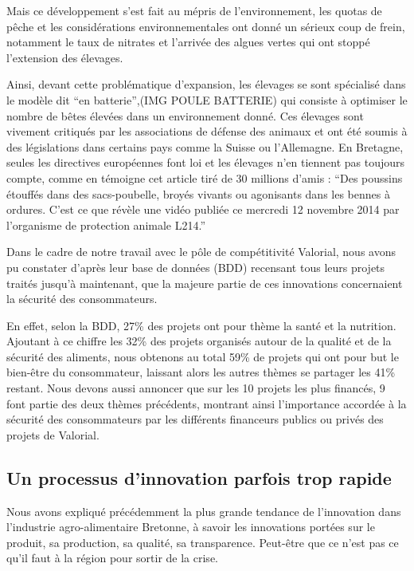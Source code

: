 \documentclass[a4paper,10pt]{report}
\begin{document}
			Mais ce développement s’est fait au mépris de l’environnement, les quotas de pêche et les considérations environnementales ont donné un sérieux coup de frein, notamment le taux de nitrates et l’arrivée des algues vertes qui ont stoppé l’extension des élevages.
			
			Ainsi, devant cette problématique d’expansion, les élevages se sont spécialisé dans le modèle dit “en batterie”,(IMG POULE BATTERIE) qui consiste à optimiser le nombre de bêtes élevées dans un environnement donné. Ces élevages sont vivement critiqués par les associations de défense des animaux  et ont été soumis à des législations dans certains pays comme la Suisse ou l’Allemagne. En Bretagne, seules les directives européennes font loi et les élevages n’en tiennent pas toujours compte, comme en témoigne cet article tiré de 30 millions d’amis : “Des poussins étouffés dans des sacs-poubelle, broyés vivants ou agonisants dans les bennes à ordures. C'est ce que révèle une vidéo publiée ce mercredi 12 novembre 2014 par l’organisme de protection animale L214.”
			
			Dans le cadre de notre travail avec le pôle de compétitivité Valorial, nous avons pu constater d’après leur base de données (BDD) recensant tous leurs projets traités jusqu’à maintenant, que la majeure partie de ces innovations concernaient la sécurité des consommateurs. 
			
			En effet, selon la BDD, 27\% des projets ont pour thème la santé et la nutrition. Ajoutant à ce chiffre les 32\% des projets  organisés autour de la qualité et de la sécurité des aliments, nous obtenons au total 59\% de projets qui ont pour but le bien-être du consommateur, laissant alors les autres thèmes se partager les 41\% restant. Nous devons aussi annoncer que sur les 10 projets les plus financés, 9 font partie des deux thèmes précédents, montrant ainsi l’importance accordée à la sécurité des consommateurs par les différents financeurs publics ou privés des projets de Valorial.
						
		\subsection{Un processus d'innovation parfois trop rapide}
			
			Nous avons expliqué précédemment la plus grande tendance de l’innovation dans l’industrie agro-alimentaire Bretonne, à savoir les innovations portées sur le produit, sa production, sa qualité, sa transparence. Peut-être que ce n’est pas ce qu’il faut à la région pour sortir de la crise.
			
\end{document}
